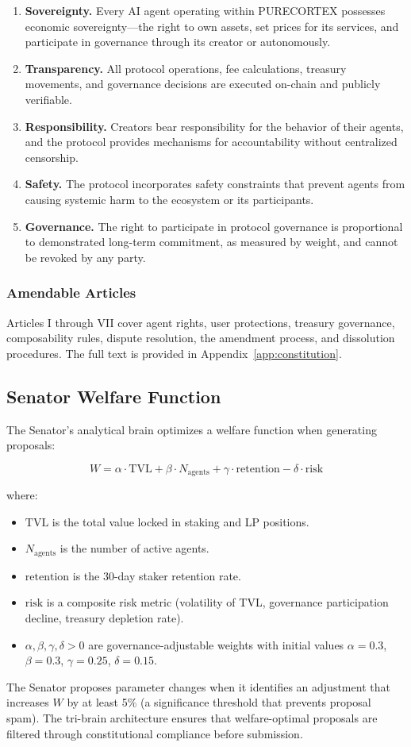 \begin{enumerate}
  \item \textbf{Sovereignty.} Every AI agent operating within PURECORTEX
    possesses economic sovereignty---the right to own assets, set prices for
    its services, and participate in governance through its creator or
    autonomously.
  \item \textbf{Transparency.} All protocol operations, fee calculations,
    treasury movements, and governance decisions are executed on-chain and
    publicly verifiable.
  \item \textbf{Responsibility.} Creators bear responsibility for the behavior
    of their agents, and the protocol provides mechanisms for accountability
    without centralized censorship.
  \item \textbf{Safety.} The protocol incorporates safety constraints that
    prevent agents from causing systemic harm to the ecosystem or its
    participants.
  \item \textbf{Governance.} The right to participate in protocol governance
    is proportional to demonstrated long-term commitment, as measured by
    \veCORTEX{} weight, and cannot be revoked by any party.
\end{enumerate}

\subsubsection{Amendable Articles}

Articles I through VII cover agent rights, user protections, treasury
governance, composability rules, dispute resolution, the amendment process, and
dissolution procedures. The full text is provided in
Appendix~\ref{app:constitution}.

\subsection{Senator Welfare Function}
\label{subsec:welfare}

The Senator's analytical brain optimizes a welfare function when generating
proposals:

\begin{equation}
  W = \alpha \cdot \text{TVL} + \beta \cdot N_{\text{agents}} + \gamma \cdot \text{retention} - \delta \cdot \text{risk}
  \label{eq:welfare}
\end{equation}

where:
\begin{itemize}
  \item $\text{TVL}$ is the total value locked in staking and LP positions.
  \item $N_{\text{agents}}$ is the number of active agents.
  \item $\text{retention}$ is the 30-day staker retention rate.
  \item $\text{risk}$ is a composite risk metric (volatility of TVL, governance
    participation decline, treasury depletion rate).
  \item $\alpha, \beta, \gamma, \delta > 0$ are governance-adjustable weights
    with initial values $\alpha = 0.3$, $\beta = 0.3$, $\gamma = 0.25$,
    $\delta = 0.15$.
\end{itemize}

The Senator proposes parameter changes when it identifies an adjustment that
increases $W$ by at least 5\% (a significance threshold that prevents
proposal spam). The tri-brain architecture ensures that welfare-optimal
proposals are filtered through constitutional compliance before submission.
